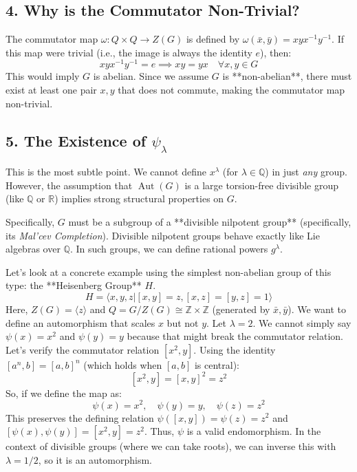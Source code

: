\documentclass{book}
\newcommand{\Q}{{\mathbb{Q}}}
\newcommand{\R}{{\mathbb{R}}}
\newcommand{\Z}{{\mathbb{Z}}}
\newcommand{\Aut}{{\operatorname{Aut}}}
\renewcommand{\mid}{\big|}
\begin{document}
\subsection*{4. Why is the Commutator Non-Trivial?}

The commutator map $\omega: Q \times Q \to Z(G)$ is defined by $\omega(\bar{x}, \bar{y}) = xyx^{-1}y^{-1}$.
If this map were trivial (i.e., the image is always the identity $e$), then:
\[ xyx^{-1}y^{-1} = e \implies xy = yx \quad \forall x,y \in G \]
This would imply $G$ is abelian.
Since we assume $G$ is **non-abelian**, there must exist at least one pair $x, y$ that does not commute, making the commutator map non-trivial.

\subsection*{5. The Existence of $\psi_\lambda$}

This is the most subtle point. We cannot define $x^\lambda$ (for $\lambda \in \Q$) in just \emph{any} group. However, the assumption that $\Aut(G)$ is a large torsion-free divisible group (like $\Q$ or $\R$) implies strong structural properties on $G$.

Specifically, $G$ must be a subgroup of a **divisible nilpotent group** (specifically, its \emph{Mal'cev Completion}). Divisible nilpotent groups behave exactly like Lie algebras over $\Q$. In such groups, we can define rational powers $g^\lambda$.

Let's look at a concrete example using the simplest non-abelian group of this type: the **Heisenberg Group** $H$.
\[ H = \langle x, y, z \mid [x, y] = z, [x, z] = [y, z] = 1 \rangle \]
Here, $Z(G) = \langle z \rangle$ and $Q = G/Z(G) \cong \Z \times \Z$ (generated by $\bar{x}, \bar{y}$).
We want to define an automorphism that scales $x$ but not $y$.
Let $\lambda = 2$.
We cannot simply say $\psi(x) = x^2$ and $\psi(y) = y$ because that might break the commutator relation.
Let's verify the commutator relation $[x^2, y]$.
Using the identity $[a^n, b] = [a, b]^n$ (which holds when $[a,b]$ is central):
\[ [x^2, y] = [x, y]^2 = z^2 \]
So, if we define the map as:
\[ \psi(x) = x^2, \quad \psi(y) = y, \quad \psi(z) = z^2 \]
This preserves the defining relation $\psi([x, y]) = \psi(z) = z^2$ and $[\psi(x), \psi(y)] = [x^2, y] = z^2$.
Thus, $\psi$ is a valid endomorphism. In the context of divisible groups (where we can take roots), we can inverse this with $\lambda = 1/2$, so it is an automorphism.
\end{document}
